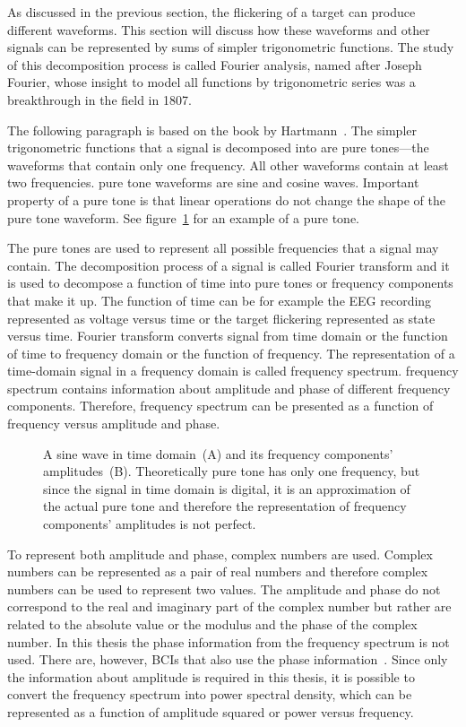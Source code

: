 As discussed in the previous section, the \gls{flickering} of a \gls{target} can produce different waveforms. This section will discuss how these waveforms and other signals can be represented by sums of simpler trigonometric functions. The study of this decomposition process is called Fourier analysis, named after Joseph Fourier, whose insight to model all functions by trigonometric series was a breakthrough in the field in 1807.

The following paragraph is based on the book by Hartmann~\cite{pure_tone}. The simpler trigonometric functions that a signal is decomposed into are \glspl{pure tone}---the waveforms that contain only one frequency. All other waveforms contain at least two frequencies. \Gls{pure tone} waveforms are sine and cosine waves. Important property of a \gls{pure tone} is that linear operations do not change the shape of the \gls{pure tone} waveform. See figure~\ref{fig:pure_tone} for an example of a \gls{pure tone}.

The \glspl{pure tone} are used to represent all possible frequencies that a signal may contain. The decomposition process of a signal is called \gls{Fourier transform} and it is used to decompose a function of time into \glspl{pure tone} or \glspl{frequency component} that make it up. The function of time can be for example the \gls{EEG} recording represented as voltage versus time or the \gls{target} \gls{flickering} represented as \gls{state} versus time. \Gls{Fourier transform} converts signal from time domain or the function of time to frequency domain or the function of frequency. The representation of a time-domain signal in a frequency domain is called \gls{frequency spectrum}. \Gls{frequency spectrum} contains information about amplitude and phase of different \glspl{frequency component}. Therefore, \gls{frequency spectrum} can be presented as a function of frequency versus amplitude and phase.

\begin{figure}[h]
	
	\caption{A sine wave in time domain~(A) and its frequency components' amplitudes~(B). Theoretically pure tone has only one frequency, but since the signal in time domain is digital, it is an approximation of the actual pure tone and therefore the representation of frequency components' amplitudes is not perfect.}
	\label{fig:pure_tone}
\end{figure}

To represent both amplitude and phase, complex numbers are used. Complex numbers can be represented as a pair of real numbers and therefore complex numbers can be used to represent two values. The amplitude and phase do not correspond to the real and imaginary part of the complex number but rather are related to the absolute value or the modulus and the phase of the complex number. In this thesis the phase information from the \gls{frequency spectrum} is not used. There are, however, \glspl{BCI} that also use the phase information~\cite{MPCC}. Since only the information about amplitude is required in this thesis, it is possible to convert the \gls{frequency spectrum} into \gls{power spectral density}, which can be represented as a function of amplitude squared or power versus frequency.

